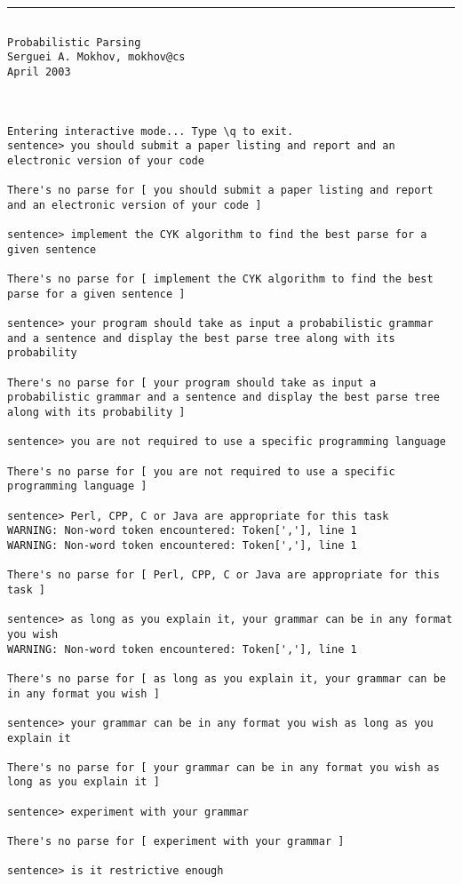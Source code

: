 \tiny
\hrule\vskip4pt
\begin{verbatim}

Probabilistic Parsing
Serguei A. Mokhov, mokhov@cs
April 2003



Entering interactive mode... Type \q to exit.
sentence> you should submit a paper listing and report and an electronic version of your code

There's no parse for [ you should submit a paper listing and report and an electronic version of your code ]

sentence> implement the CYK algorithm to find the best parse for a given sentence

There's no parse for [ implement the CYK algorithm to find the best parse for a given sentence ]

sentence> your program should take as input a probabilistic grammar and a sentence and display the best parse tree along with its probability

There's no parse for [ your program should take as input a probabilistic grammar and a sentence and display the best parse tree along with its probability ]

sentence> you are not required to use a specific programming language

There's no parse for [ you are not required to use a specific programming language ]

sentence> Perl, CPP, C or Java are appropriate for this task
WARNING: Non-word token encountered: Token[','], line 1
WARNING: Non-word token encountered: Token[','], line 1

There's no parse for [ Perl, CPP, C or Java are appropriate for this task ]

sentence> as long as you explain it, your grammar can be in any format you wish
WARNING: Non-word token encountered: Token[','], line 1

There's no parse for [ as long as you explain it, your grammar can be in any format you wish ]

sentence> your grammar can be in any format you wish as long as you explain it

There's no parse for [ your grammar can be in any format you wish as long as you explain it ]

sentence> experiment with your grammar

There's no parse for [ experiment with your grammar ]

sentence> is it restrictive enough


\end{verbatim}
